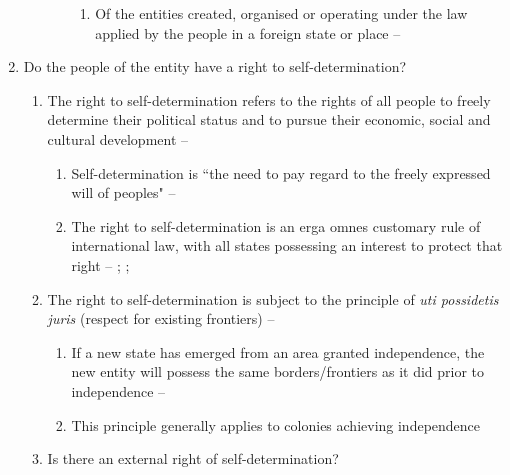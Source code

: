 \begin{enumerate}
\begin{enumerate}
\begin{enumerate}
\begin{enumerate}
                \item Of the entities created, organised or operating under the law applied by the people in a foreign state or place -- 
            \end{enumerate}
        \end{enumerate}
    \end{enumerate}
    \item Do the people of the entity have a right to self-determination?
    \begin{enumerate}
        \item The right to self-determination refers to the rights of all people to freely determine their political status and to pursue their economic, social and cultural development -- 
        \begin{enumerate}
            \item Self-determination is ``the need to pay regard to the freely expressed will of peoples" -- 
            \item The right to self-determination is an \gls{erga omnes} customary rule of international law, with all states possessing an interest to protect that right -- ; ; 
        \end{enumerate}
        \item The right to self-determination is subject to the principle of \textit{uti possidetis juris} (respect for existing frontiers) -- 
        \begin{enumerate}
            \item If a new state has emerged from an area granted independence, the new entity will possess the same borders/frontiers as it did prior to independence -- 
            \item This principle generally applies to colonies achieving independence
        \end{enumerate}
        \item Is there an external right of self-determination?
        \begin{enumerate}

\end{enumerate}
\end{enumerate}
\end{enumerate}
